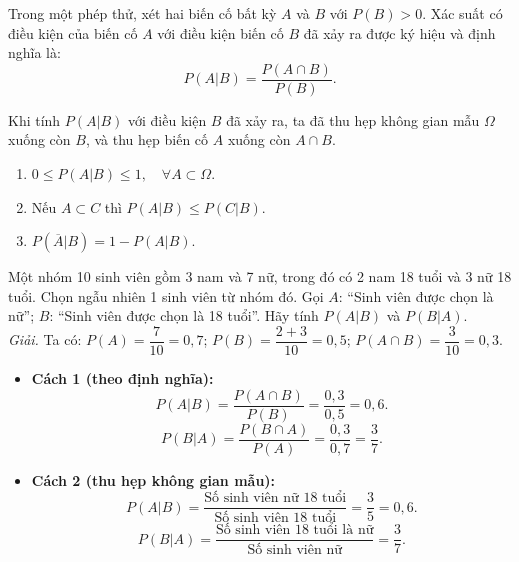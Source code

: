 \begin{dinhnghia}
Trong một phép thử, xét hai biến cố bất kỳ $A$ và $B$ với $P(B) > 0$. Xác suất có điều kiện của biến cố $A$ với điều kiện biến cố $B$ đã xảy ra được ký hiệu và định nghĩa là:
\[
P(A|B) = \frac{P(A \cap B)}{P(B)}.
\]
\end{dinhnghia}

\begin{nhanxet}
Khi tính $P(A|B)$ với điều kiện $B$ đã xảy ra, ta đã thu hẹp không gian mẫu $\Omega$ xuống còn $B$, và thu hẹp biến cố $A$ xuống còn $A \cap B$.
\end{nhanxet}

\begin{tinhchat}
\begin{enumerate}[label=\arabic*)]
    \item $0 \le P(A|B) \le 1,\quad \forall A \subset \Omega$.
    \item Nếu $A \subset C$ thì $P(A|B) \le P(C|B)$.
    \item $P(\overline{A}|B) = 1 - P(A|B)$.
\end{enumerate}
\end{tinhchat}

\begin{vidu}
Một nhóm 10 sinh viên gồm 3 nam và 7 nữ, trong đó có 2 nam 18 tuổi và 3 nữ 18 tuổi. Chọn ngẫu nhiên 1 sinh viên từ nhóm đó.
Gọi $A$: ``Sinh viên được chọn là nữ''; $B$: ``Sinh viên được chọn là 18 tuổi''.
Hãy tính $P(A|B)$ và $P(B|A)$.\\
\textit{Giải.} 
Ta có: $P(A) = \dfrac{7}{10} = 0{,}7$; $P(B) = \dfrac{2 + 3}{10} = 0{,}5$; $P(A \cap B) = \dfrac{3}{10} = 0{,}3$.
\begin{itemize}
    \item \textbf{Cách 1 (theo định nghĩa):}
    \[
    P(A|B) = \frac{P(A \cap B)}{P(B)} = \frac{0{,}3}{0{,}5} = 0{,}6.
    \]
    \[
    P(B|A) = \frac{P(B \cap A)}{P(A)} = \frac{0{,}3}{0{,}7} = \frac{3}{7}.
    \]
    \item \textbf{Cách 2 (thu hẹp không gian mẫu):}
    \[
    P(A|B) = \frac{\text{Số sinh viên nữ 18 tuổi}}{\text{Số sinh viên 18 tuổi}} = \frac{3}{5} = 0{,}6.
    \]
    \[
    P(B|A) = \frac{\text{Số sinh viên 18 tuổi là nữ}}{\text{Số sinh viên nữ}} = \frac{3}{7}.
    \]
\end{itemize}
\end{vidu}

